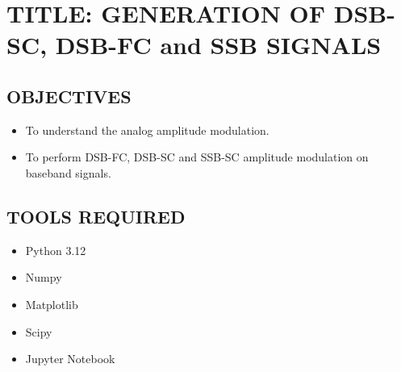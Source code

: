 \section*{TITLE\@: GENERATION OF DSB-SC, DSB-FC and SSB SIGNALS}

\subsection*{OBJECTIVES}
{}

\begin{itemize}
\item To understand the analog amplitude modulation.
\item To perform DSB-FC, DSB-SC and SSB-SC amplitude modulation on baseband signals.
\end{itemize}

\subsection*{TOOLS REQUIRED}
\begin{itemize}
\item Python 3.12
\item Numpy
\item Matplotlib
\item Scipy
\item Jupyter Notebook
\end{itemize}
